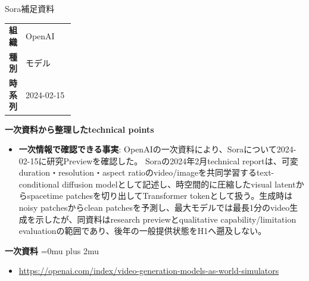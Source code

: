 \begin{technicalnote}{Sora}{補足資料}
\begingroup
\begin{tabularx}{\linewidth}{@{}>{\bfseries}p{0.22\linewidth}X@{}}
組織 & OpenAI \\
種別 & モデル \\
時系列 & 2024-02-15 \\
\end{tabularx}
\smallskip
{\bfseries 一次資料から整理したtechnical points}
\begin{itemize}[leftmargin=1.5em,itemsep=0.35em]
\item \textbf{一次情報で確認できる事実}: OpenAIの一次資料により、Soraについて2024-02-15に研究Previewを確認した。 Soraの2024年2月technical reportは、可変duration・resolution・aspect ratioのvideo/imageを共同学習するtext-conditional diffusion modelとして記述し、時空間的に圧縮したvisual latentからspacetime patchesを切り出してTransformer tokenとして扱う。生成時はnoisy patchesからclean patchesを予測し、最大モデルでは最長1分のvideo生成を示したが、同資料はresearch previewとqualitative capability/limitation evaluationの範囲であり、後年の一般提供状態をH1へ遡及しない。
\end{itemize}
\begin{minipage}{\linewidth}
\begin{samepage}
{\bfseries 一次資料}
\begingroup\sloppy
\Urlmuskip=0mu plus 2mu\relax
\begin{itemize}[leftmargin=1.5em,itemsep=0.25em]
\item {\scriptsize\url{https://openai.com/index/video-generation-models-as-world-simulators}}
\end{itemize}
\endgroup
\end{samepage}
\end{minipage}
\endgroup
\end{technicalnote}
\medskip

